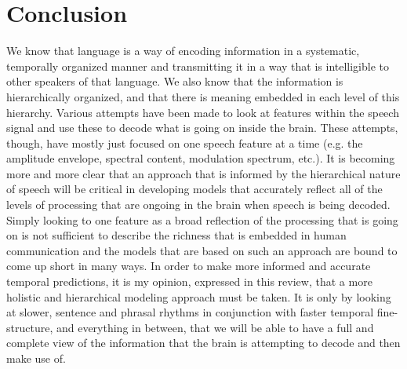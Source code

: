 \documentclass[titlepage]{article}
\begin{document}



\section{Conclusion}

    We know that language is a way of encoding information in a systematic, 
    temporally organized manner and transmitting it in a way that is intelligible 
    to other speakers of that language. We also know that the information is 
    hierarchically organized, and that there is meaning embedded in each level 
    of this hierarchy. Various attempts have been made to look at 
    features within the speech signal and use these to decode what is going on 
    inside the brain. These attempts, though, have mostly just focused on one
    speech feature at a time (e.g. the amplitude envelope, spectral content, 
    modulation spectrum, etc.). It is becoming more and more clear that an 
    approach that is informed by the hierarchical nature of speech will be 
    critical in developing models that accurately reflect all of the levels 
    of processing that are ongoing in the brain when speech is being decoded. 
    Simply looking to one feature as a broad reflection of the processing that 
    is going on is not sufficient to describe the richness that is embedded 
    in human communication and the models that are based on such an approach 
    are bound to come up short in many ways. In order to make more informed and 
    accurate temporal predictions, it is my opinion, expressed in this review, 
    that a more holistic and hierarchical modeling approach must be taken. It 
    is only by looking at slower, sentence and phrasal rhythms in conjunction 
    with faster temporal fine-structure, and everything in between, that we  
    will be able to have a full and complete view of the information that the 
    brain is attempting to decode and then make use of. 
\end{document}
